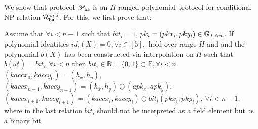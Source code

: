 \noindent We show that protocol $\mathscr{P}_{\mathsf{ba}}$ is an $H$-ranged polynomial protocol for 
conditional NP relation $\mathcal{R}^{\mathit{incl}}_{\mathsf{ba}}$. For this, we first prove that:
\begin{test_claim} Assume that $\forall i < n-1$ such that $\mathit{bit}_i = 1$, $pk_i = (pkx_i, pky_i) \in \mathbb{G}_{\mathit{1,inn}}$. 
If polynomial identities $id_i(X) = 0, \forall i \in [5],$ hold over range 
$H$ and and the polynomial $b(X)$ has been constructed via interpolation on $H$ such that $b(\omega^i) = \mathit{bit}_i, \forall i <n$ then $\mathit{bit}_i \in \mathbb{B} = \{0,1\} \subset \mathbb{F}, \forall i <n$ \\
$(kaccx_{0}, kaccy_{0}) = (h_x, h_y)$, $(kaccx_{n-1}, kaccy_{n-1}) = (h_x, h_y) \oplus (apk_x, apk_y)$, \\
$(kaccx_{i+1}, kaccy_{i+1}) =  (kaccx_{i}, kaccy_{i}) \oplus \mathit{bit}_i(pkx_{i}, pky_{i})$, $\forall i < n-1$, 
where in the last relation $\mathit{bit_i}$ should not be interpreted as a field element but as a binary bit.
\label{claim:keys_affine_comm}
\end{test_claim}

